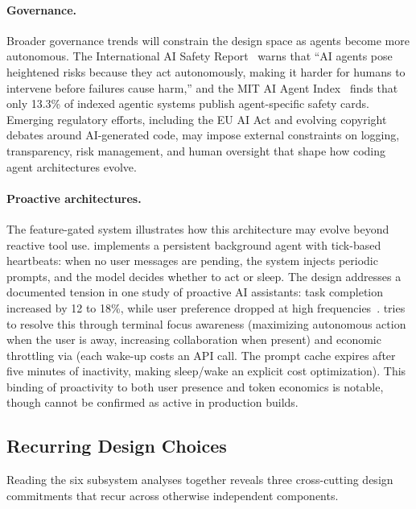 \paragraph{Governance.}
Broader governance trends will constrain the design space as agents become more autonomous. The International AI Safety Report~\citep{bengio2026safety} warns that ``AI agents pose heightened risks because they act autonomously, making it harder for humans to intervene before failures cause harm,'' and the MIT AI Agent Index~\citep{staufer2026agentindex} finds that only 13.3\% of indexed agentic systems publish agent-specific safety cards. Emerging regulatory efforts, including the EU AI Act and evolving copyright debates around AI-generated code, may impose external constraints on logging, transparency, risk management, and human oversight that shape how coding agent architectures evolve.

\paragraph{Proactive architectures.}
The feature-gated  system illustrates how this architecture may evolve beyond reactive tool use.  implements a persistent background agent with tick-based heartbeats: when no user messages are pending, the system injects periodic  prompts, and the model decides whether to act or sleep. The design addresses a documented tension in one study of proactive AI assistants: task completion increased by 12 to 18\%, while user preference dropped at high frequencies~\citep{chi2025proactive}.  tries to resolve this through terminal focus awareness (maximizing autonomous action when the user is away, increasing collaboration when present) and economic throttling via  (each wake-up costs an API call. The prompt cache expires after five minutes of inactivity, making sleep/wake an explicit cost optimization). This binding of proactivity to both user presence and token economics is notable, though  cannot be confirmed as active in production builds.

\subsection{Recurring Design Choices}
\label{sec:discuss:guidelines}

Reading the six subsystem analyses together reveals three cross-cutting design commitments that recur across otherwise independent components.

